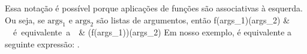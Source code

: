 Essa nota\c{c}\~{a}o \'{e} poss\'{i}vel porque aplica\c{c}\~{o}es de fun\c{c}\~{o}es s\~{a}o associativas à esquerda.
Ou seja, se $\mbox{args}_1$ e $\mbox{args}_2$ s\~{a}o listas de argumentos, ent\~{a}o 
f(\mbox{args}_1)(\mbox{args}_2) & \ \ \mbox{\'{e} equivalente a}\ \ & (f(\mbox{args}_1))(\mbox{args}_2)
\eda
Em nosso exemplo,  \'{e} equivalente a seguinte express\~{a}o:
.

